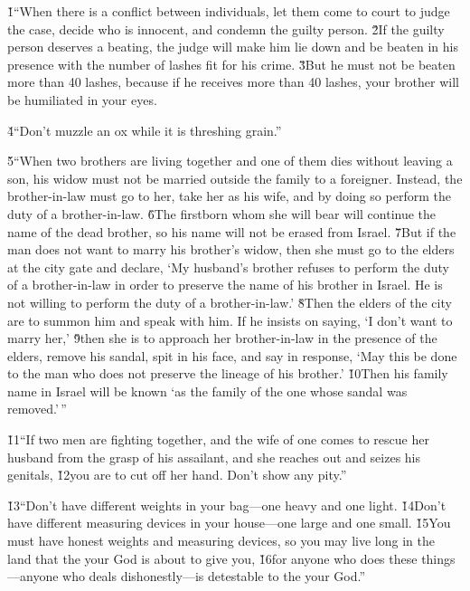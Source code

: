 \v{1}``When there is a conflict between individuals, let them come to court to judge the case, decide who is innocent, and condemn the guilty person. \v{2}If the guilty person deserves a beating, the judge will make him lie down and be beaten in his presence with the number of lashes fit for his crime. \v{3}But he must not be beaten more than 40 lashes, because if he receives more than 40 lashes, your brother will be humiliated in your eyes.

\v{4}``Don't muzzle an ox while it is threshing grain.''

\v{5}``When two brothers are living together and one of them dies without leaving a son, his widow must not be married outside the family to a foreigner. Instead, the brother-in-law must go to her, take her as his wife, and by doing so perform the duty of a brother-in-law. \v{6}The firstborn whom she will bear will continue the name of the dead brother, so his name will not be erased from Israel. \v{7}But if the man does not want to marry his brother's widow, then she must go to the elders at the city gate and declare, `My husband's brother refuses to perform the duty of a brother-in-law in order to preserve the name of his brother in Israel. He is not willing to perform the duty of a brother-in-law.' \v{8}Then the elders of the city are to summon him and speak with him. If he insists on saying, `I don't want to marry her,' \v{9}then she is to approach her brother-in-law in the presence of the elders, remove his sandal, spit in his face, and say in response, `May this be done to the man who does not preserve the lineage of his brother.' \v{10}Then his family name in Israel will be known `as the family of the one whose sandal was removed.'\,''

\v{11}``If two men are fighting together, and the wife of one comes to rescue her husband from the grasp of his assailant, and she reaches out and seizes his genitals, \v{12}you are to cut off her hand. Don't show any pity.''

\v{13}``Don't have different weights in your bag---one heavy and one light. \v{14}Don't have different measuring devices in your house---one large and one small. \v{15}You must have honest weights and measuring devices, so you may live long in the land that the  your God is about to give you, \v{16}for anyone who does these things---anyone who deals dishonestly---is detestable to the  your God.''

